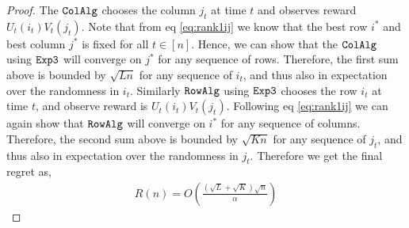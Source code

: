 \begin{proof}

The ${\tt ColAlg}$ chooses the column $j_t$ at time $t$ and observes reward $U_t(i_t) V_t(j_t)$. Note that from eq \eqref{eq:rank1ij} we know that the best row $i^*$ and best column $j^*$ is fixed for all $t\in [n]$. Hence, we can show that the ${\tt ColAlg}$ using ${\tt Exp3}$ will converge on $j^*$ for any sequence of rows. Therefore, the first sum above is bounded by $\sqrt{L n}$ for any sequence of $i_t$, and thus also in expectation over the randomness in $i_t$. Similarly ${\tt RowAlg}$ using ${\tt Exp3}$ chooses the row $i_t$ at time $t$, and observe reward is $U_t(i_t) V_t(j_t)$. Following eq \eqref{eq:rank1ij} we can again show that ${\tt RowAlg}$ will converge on $i^*$ for any sequence of columns. Therefore, the second sum above is bounded by $\sqrt{K n}$ for any sequence of $j_t$, and thus also in expectation over the randomness in $j_t$. Therefore we get the final regret as,
\begin{align*}
  R(n) = O\left(\frac{\left(\sqrt{L } + \sqrt{K }\right)\sqrt{n}}{\alpha}\right)
\end{align*}
\end{proof}






